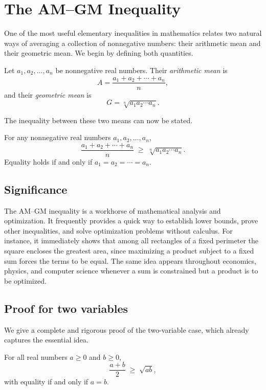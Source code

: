 \section{The AM--GM Inequality}

One of the most useful elementary inequalities in mathematics relates two natural ways of averaging a collection of nonnegative numbers: their arithmetic mean and their geometric mean. We begin by defining both quantities.

\begin{definition}
Let $a_1, a_2, \dots, a_n$ be nonnegative real numbers. Their \emph{arithmetic mean} is
\[
A = \frac{a_1 + a_2 + \cdots + a_n}{n},
\]
and their \emph{geometric mean} is
\[
G = \sqrt[n]{a_1 a_2 \cdots a_n}.
\]
\end{definition}

The inequality between these two means can now be stated.

\begin{theorem}[AM--GM inequality]\label{thm:amgm}
For any nonnegative real numbers $a_1, a_2, \dots, a_n$,
\[
\frac{a_1 + a_2 + \cdots + a_n}{n} \;\geq\; \sqrt[n]{a_1 a_2 \cdots a_n}.
\]
Equality holds if and only if $a_1 = a_2 = \cdots = a_n$.
\end{theorem}

\subsection{Significance}

The AM--GM inequality is a workhorse of mathematical analysis and optimization. It frequently provides a quick way to establish lower bounds, prove other inequalities, and solve optimization problems without calculus. For instance, it immediately shows that among all rectangles of a fixed perimeter the square encloses the greatest area, since maximizing a product subject to a fixed sum forces the terms to be equal. The same idea appears throughout economics, physics, and computer science whenever a sum is constrained but a product is to be optimized.

\subsection{Proof for two variables}

We give a complete and rigorous proof of the two-variable case, which already captures the essential idea.

\begin{theorem}\label{thm:amgm2}
For all real numbers $a \geq 0$ and $b \geq 0$,
\[
\frac{a + b}{2} \;\geq\; \sqrt{ab},
\]
with equality if and only if $a = b$.
\end{theorem}

